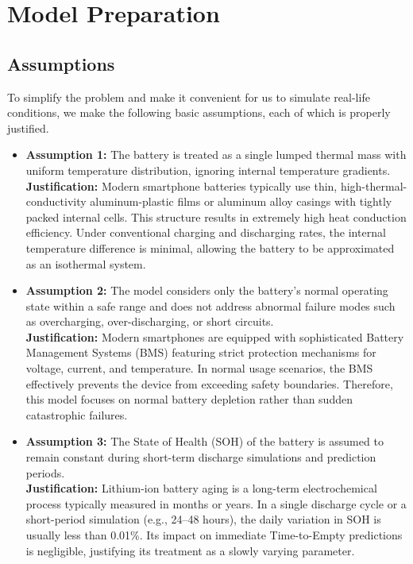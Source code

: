 \section{Model Preparation}
\label{sec:assumptions}

\subsection{Assumptions}
\label{subsec:assumptions}

\hspace*{\parindent}To simplify the problem and make it convenient for us to simulate real-life conditions, we make the following basic assumptions, each of which is properly justified.

\begin{itemize}
    \item \textbf{Assumption 1:} The battery is treated as a single lumped thermal mass with uniform temperature distribution, ignoring internal temperature gradients.\\
    \textbf{Justification:} Modern smartphone batteries typically use thin, high-thermal-conductivity aluminum-plastic films or aluminum alloy casings with tightly packed internal cells. This structure results in extremely high heat conduction efficiency. Under conventional charging and discharging rates, the internal temperature difference is minimal, allowing the battery to be approximated as an isothermal system.

    \item \textbf{Assumption 2:} The model considers only the battery's normal operating state within a safe range and does not address abnormal failure modes such as overcharging, over-discharging, or short circuits.\\
    \textbf{Justification:} Modern smartphones are equipped with sophisticated Battery Management Systems (BMS) featuring strict protection mechanisms for voltage, current, and temperature. In normal usage scenarios, the BMS effectively prevents the device from exceeding safety boundaries. Therefore, this model focuses on normal battery depletion rather than sudden catastrophic failures.

    \item \textbf{Assumption 3:} The State of Health (SOH) of the battery is assumed to remain constant during short-term discharge simulations and prediction periods.\\
    \textbf{Justification:} Lithium-ion battery aging is a long-term electrochemical process typically measured in months or years. In a single discharge cycle or a short-period simulation (e.g., 24--48 hours), the daily variation in SOH is usually less than 0.01\%. Its impact on immediate Time-to-Empty predictions is negligible, justifying its treatment as a slowly varying parameter.


\end{itemize}
